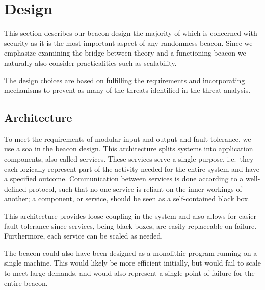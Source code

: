 \section{Design}\label{sec:design}

This section describes our beacon design the majority of which is concerned with security as it is the most important aspect of any randomness beacon.
Since we emphasize examining the bridge between theory and a functioning beacon we naturally also consider practicalities such as scalability.

The design choices are based on fulfilling the requirements and incorporating mechanisms to prevent as many of the threats identified in the threat analysis.

\subsection{Architecture}\label{sec:design_architecture}
To meet the requirements of modular input and output and fault tolerance, we use a \gls{soa} in the beacon design.
This architecture splits systems into application components, also called services.
These services serve a single purpose, i.e.\ they each logically represent part of the activity needed for the entire system and have a specified outcome.
Communication between services is done according to a well-defined protocol, such that no one service is reliant on the inner workings of another;
a component, or service, should be seen as a self-contained black box.

This architecture provides loose coupling in the system and also allows for easier fault tolerance since services, being black boxes, are easily replaceable on failure.
Furthermore, each service can be scaled as needed.

The beacon could also have been designed as a monolithic program running on a single machine.
This would likely be more efficient initially, but would fail to scale to meet large demands, and would also represent a single point of failure for the entire beacon.
